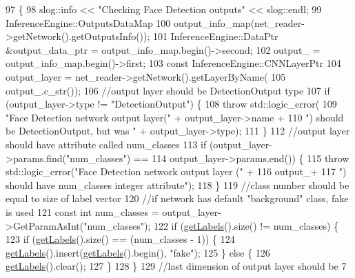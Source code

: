 \begin{DoxyCode}
97                                                       \{
98   slog::info << \textcolor{stringliteral}{"Checking Face Detection outputs"} << slog::endl;
99   InferenceEngine::OutputsDataMap
100       output\_info\_map(net\_reader->getNetwork().getOutputsInfo());
101   InferenceEngine::DataPtr &output\_data\_ptr = output\_info\_map.begin()->second;
102   output\_ = output\_info\_map.begin()->first;
103   \textcolor{keyword}{const} InferenceEngine::CNNLayerPtr
104       output\_layer = net\_reader->getNetwork().getLayerByName(
105       output\_.c\_str());
106   \textcolor{comment}{//output layer should be DetectionOutput type}
107   \textcolor{keywordflow}{if} (output\_layer->type != \textcolor{stringliteral}{"DetectionOutput"}) \{
108     \textcolor{keywordflow}{throw} std::logic\_error(
109         \textcolor{stringliteral}{"Face Detection network output layer("} + output\_layer->name +
110             \textcolor{stringliteral}{") should be DetectionOutput, but was "} + output\_layer->type);
111   \}
112   \textcolor{comment}{//output layer should have attribute called num\_classes}
113   \textcolor{keywordflow}{if} (output\_layer->params.find(\textcolor{stringliteral}{"num\_classes"}) ==
114       output\_layer->params.end()) \{
115     \textcolor{keywordflow}{throw} std::logic\_error(\textcolor{stringliteral}{"Face Detection network output layer ("} +
116         output\_+
117         \textcolor{stringliteral}{") should have num\_classes integer attribute"});
118   \}
119   \textcolor{comment}{//class number should be equal to size of label vector}
120   \textcolor{comment}{//if network has default "background" class, fake is used}
121   \textcolor{keyword}{const} \textcolor{keywordtype}{int} num\_classes = output\_layer->GetParamAsInt(\textcolor{stringliteral}{"num\_classes"});
122   \textcolor{keywordflow}{if} (\hyperlink{classValidatedBaseNetwork_a910ff44b8e6d9433e713131c59468900}{getLabels}().size() != num\_classes) \{
123     \textcolor{keywordflow}{if} (\hyperlink{classValidatedBaseNetwork_a910ff44b8e6d9433e713131c59468900}{getLabels}().size() == (num\_classes - 1)) \{
124       \hyperlink{classValidatedBaseNetwork_a910ff44b8e6d9433e713131c59468900}{getLabels}().insert(\hyperlink{classValidatedBaseNetwork_a910ff44b8e6d9433e713131c59468900}{getLabels}().begin(), \textcolor{stringliteral}{"fake"});
125     \} \textcolor{keywordflow}{else} \{
126       \hyperlink{classValidatedBaseNetwork_a910ff44b8e6d9433e713131c59468900}{getLabels}().clear();
127     \}
128   \}
129   \textcolor{comment}{//last dimension of output layer should be 7}

\end{DoxyCode}
